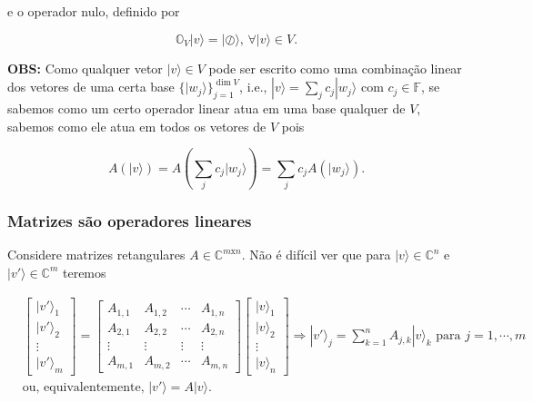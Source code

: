 \documentclass[11pt]{article}
\begin{document}
e o operador nulo, definido por

\begin{equation}
\mathbb{O}_{V}|v\rangle=|\oslash\rangle\text{, }\forall |v\rangle\in V.
\end{equation}

\textbf{OBS:} Como qualquer vetor \(|v\rangle\in V\) pode ser escrito
como uma combinação linear dos vetores de uma certa base
\(\{|w_{j}\rangle\}_{j=1}^{\dim V}\), i.e.,
\(|v\rangle=\sum_{j}c_{j}|w_{j}\rangle\) com \(c_{j}\in\mathbb{F}\), se
sabemos como um certo operador linear atua em uma base qualquer de
\(V\), sabemos como ele atua em todos os vetores de \(V\) pois

\begin{equation}
A(|v\rangle) = A\left(\sum_{j}c_{j}|w_{j}\rangle\right)=\sum_{j}c_{j}A(|w_{j}\rangle). 
\end{equation}

    \subsubsection{Matrizes são operadores
lineares}\label{matrizes-suxe3o-operadores-lineares}

Considere matrizes retangulares \(A\in\mathbb{C}^{m\text{x}n}\). Não é
difícil ver que para \(|v\rangle\in\mathbb{C}^{n}\) e
\(|v'\rangle\in\mathbb{C}^{m}\) teremos

\begin{align}
& \begin{bmatrix} |v'\rangle_{1} \\ |v'\rangle_{2} \\ \vdots \\ |v'\rangle_{m} \end{bmatrix} = \begin{bmatrix} A_{1,1} & A_{1,2} & \cdots & A_{1,n} \\ A_{2,1} & A_{2,2} & \cdots & A_{2,n} \\ \vdots & \vdots & \vdots & \vdots \\ A_{m,1} & A_{m,2} & \cdots & A_{m,n} \end{bmatrix} \begin{bmatrix} |v\rangle_{1} \\ |v\rangle_{2} \\ \vdots \\ |v\rangle_{n} \end{bmatrix} \Rightarrow |v'\rangle_{j} = \sum_{k=1}^{n}A_{j,k}|v\rangle_{k}\text{ para }j=1,\cdots,m \\
& \text{ou, equivalentemente, } |v'\rangle=A|v\rangle.
\end{align}
\end{document}
